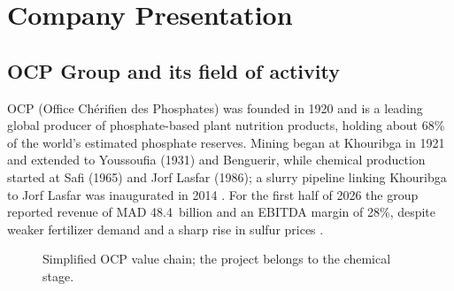 \chapter{Company Presentation}\label{ch:company}

\section{OCP Group and its field of activity}
OCP (Office Ch\'erifien des Phosphates) was founded in 1920 and is a leading global producer of phosphate-based plant nutrition products, holding about 68\% of the world's estimated phosphate reserves. Mining began at Khouribga in 1921 and extended to Youssoufia (1931) and Benguerir, while chemical production started at Safi (1965) and Jorf Lasfar (1986); a slurry pipeline linking Khouribga to Jorf Lasfar was inaugurated in 2014 \citep{wikiocp}. For the first half of 2026 the group reported revenue of MAD 48.4~billion and an EBITDA margin of 28\%, despite weaker fertilizer demand and a sharp rise in sulfur prices \citep{mwn2026}.

\begin{figure}[!htbp]\centering
{}
\caption{Simplified OCP value chain; the project belongs to the chemical stage.}\label{fig:valuechain}
\end{figure}

